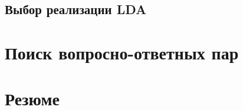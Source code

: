 \subsection{Выбор реализации LDA}
\label{sec:lda_choose}
\section{Поиск вопросно-ответных пар}

\section{Резюме}

\blindtext

